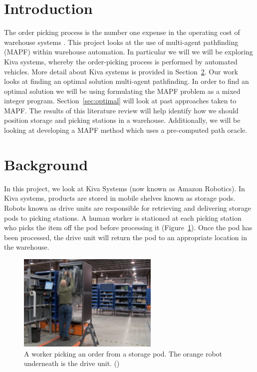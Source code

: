 \documentclass[a4paper,11pt]{article}
\begin{document}
\section{Introduction}
The order picking process is the number one expense in the operating cost of warehouse systems \cite{de2007design}. 
This project looks at the use of multi-agent pathfinding (MAPF) within warehouse automation. In particular we will we will be exploring Kiva systems, whereby the order-picking process is performed by automated vehicles. More detail about Kiva systems is provided in Section~\ref{sec:background}. Our work looks at finding an optimal solution multi-agent pathfinding.
In order to find an optimal solution we will be using formulating the MAPF problem as a mixed integer program. Section~\ref{sec:optimal} will look at past approaches taken to MAPF.
The results of this literature review will help identify how we should position storage and picking stations in a warehouse. Additionally, we will be looking at developing a MAPF method which uses a pre-computed path oracle.

\section{Background} \label{sec:background}
In this project, we look at Kiva Systems (now known as Amazon Robotics). In Kiva systems, products are stored in mobile shelves known as storage pods. Robots known as drive units are responsible for retrieving and delivering storage pods to picking stations. A human worker is stationed at each picking station who picks the item off the pod before processing it (Figure~\ref{fig:kivaprocess}). Once the pod has been processed, the drive unit will return the pod
to an appropriate location in the warehouse.

\begin{figure}[h!]
	\centering
	\includegraphics[width=0.6\textwidth ]{graphics/kivaprocess}
	\caption{A worker picking an order from a storage pod. The orange robot underneath is the drive unit. (\cite{kivayoutube2010quietlogistics})}
	\label{fig:kivaprocess}
\end{figure}
\end{document}
